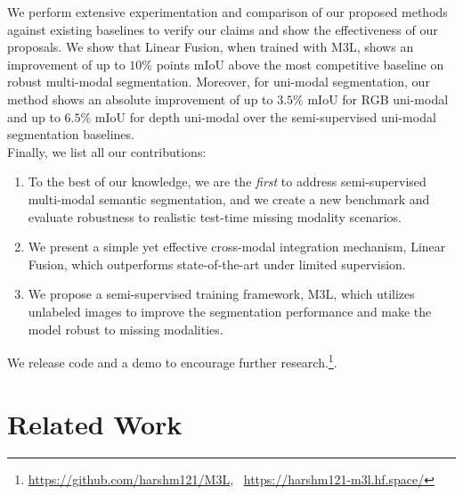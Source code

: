 \documentclass[10pt,twocolumn,letterpaper]{article}
\begin{document}
We perform extensive experimentation and comparison of our proposed methods against existing baselines to verify our claims and show the effectiveness of our proposals. We show that Linear Fusion, when trained with M3L, shows an improvement of up to $10\%$ points mIoU above the most competitive baseline on robust multi-modal segmentation. Moreover, for uni-modal segmentation, our method shows an absolute improvement of up to $3.5\%$ mIoU for RGB uni-modal and up to $6.5\%$ mIoU for depth uni-modal over the semi-supervised uni-modal segmentation baselines.\\
Finally, we list all our contributions:

\begin{enumerate}

\item To the best of our knowledge, we are the \textit{first} to address semi-supervised multi-modal semantic segmentation, and we create a new benchmark and evaluate robustness to realistic test-time missing modality scenarios.

\item We present a simple yet effective cross-modal integration mechanism, Linear Fusion, which outperforms state-of-the-art \cite{tokenfusion} under limited supervision.


\item We propose a semi-supervised training framework, M3L, which utilizes unlabeled images to improve the segmentation performance and make the model robust to missing modalities. 

\end{enumerate}

\noindent We release code and a demo to encourage further research.\footnote{\href{https://github.com/harshm121/M3L}{https://github.com/harshm121/M3L}, ~\href{https://harshm121-m3l.hf.space/}{https://harshm121-m3l.hf.space/}}.

 \section{Related Work}
\end{document}
